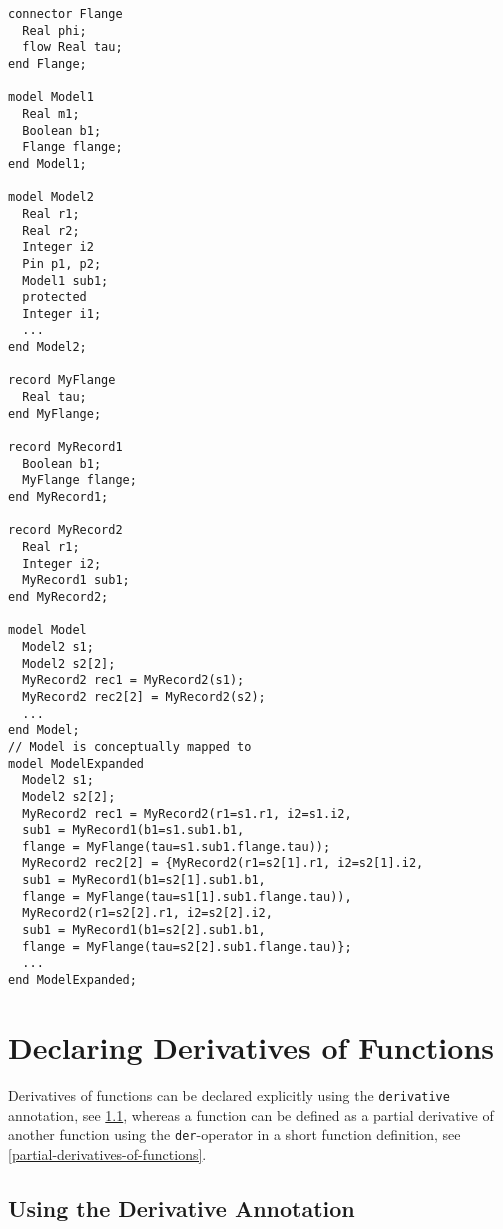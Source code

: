 \begin{example}
\begin{lstlisting}[language=modelica]
connector Flange
  Real phi;
  flow Real tau;
end Flange;

model Model1
  Real m1;
  Boolean b1;
  Flange flange;
end Model1;

model Model2
  Real r1;
  Real r2;
  Integer i2
  Pin p1, p2;
  Model1 sub1;
  protected
  Integer i1;
  ...
end Model2;

record MyFlange
  Real tau;
end MyFlange;

record MyRecord1
  Boolean b1;
  MyFlange flange;
end MyRecord1;

record MyRecord2
  Real r1;
  Integer i2;
  MyRecord1 sub1;
end MyRecord2;

model Model
  Model2 s1;
  Model2 s2[2];
  MyRecord2 rec1 = MyRecord2(s1);
  MyRecord2 rec2[2] = MyRecord2(s2);
  ...
end Model;
// Model is conceptually mapped to
model ModelExpanded
  Model2 s1;
  Model2 s2[2];
  MyRecord2 rec1 = MyRecord2(r1=s1.r1, i2=s1.i2,
  sub1 = MyRecord1(b1=s1.sub1.b1,
  flange = MyFlange(tau=s1.sub1.flange.tau));
  MyRecord2 rec2[2] = {MyRecord2(r1=s2[1].r1, i2=s2[1].i2,
  sub1 = MyRecord1(b1=s2[1].sub1.b1,
  flange = MyFlange(tau=s1[1].sub1.flange.tau)),
  MyRecord2(r1=s2[2].r1, i2=s2[2].i2,
  sub1 = MyRecord1(b1=s2[2].sub1.b1,
  flange = MyFlange(tau=s2[2].sub1.flange.tau)};
  ...
end ModelExpanded;
\end{lstlisting}
\end{example}

\section{Declaring Derivatives of Functions}\label{declaring-derivatives-of-functions}

Derivatives of functions can be declared explicitly using the \lstinline!derivative!
annotation, see \cref{using-the-derivative-annotation}, whereas a function can be defined as a
partial derivative of another function using the \lstinline!der!-operator in a short
function definition, see \cref{partial-derivatives-of-functions}.

\subsection{Using the Derivative Annotation}\label{using-the-derivative-annotation}

